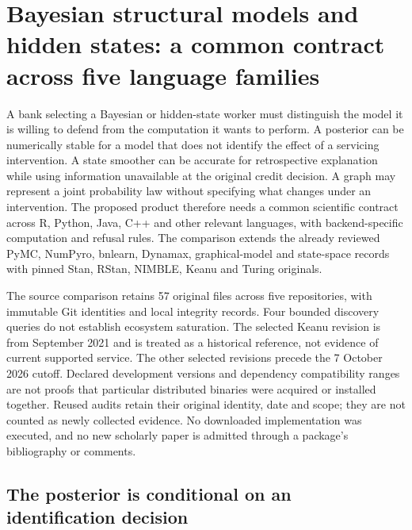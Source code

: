\section[Bayesian SCM and hidden-state workers]{Bayesian structural models and hidden states: a common contract across five language families}
\label{sec:exec25-bsw}

A bank selecting a Bayesian or hidden-state worker must distinguish the model it is willing to defend from the computation it wants to perform. A posterior can be numerically stable for a model that does not identify the effect of a servicing intervention. A state smoother can be accurate for retrospective explanation while using information unavailable at the original credit decision. A graph may represent a joint probability law without specifying what changes under an intervention. The proposed product therefore needs a common scientific contract across R, Python, Java, C++ and other relevant languages, with backend-specific computation and refusal rules. The comparison extends the already reviewed PyMC, NumPyro, bnlearn, Dynamax, graphical-model and state-space records with pinned Stan, RStan, NIMBLE, Keanu and Turing originals.~\citep{exec23_pymc_sources,exec23_numpyro_sources,exec24_bnlearn_sources,exec19_dynamax_source,exec24_libdai_source,exec24_opengm_source,exec25_bsw_stan,exec25_bsw_rstan,exec25_bsw_nimble,exec25_bsw_keanu,exec25_bsw_turing,exec25_bsw_choice}

The source comparison retains 57 original files across five repositories, with immutable Git identities and local integrity records. Four bounded discovery queries do not establish ecosystem saturation. The selected Keanu revision is from September 2021 and is treated as a historical reference, not evidence of current supported service. The other selected revisions precede the 7 October 2026 cutoff. Declared development versions and dependency compatibility ranges are not proofs that particular distributed binaries were acquired or installed together. Reused audits retain their original identity, date and scope; they are not counted as newly collected evidence. No downloaded implementation was executed, and no new scholarly paper is admitted through a package's bibliography or comments.~\citep{exec25_bsw_choice}

\subsection{The posterior is conditional on an identification decision}

